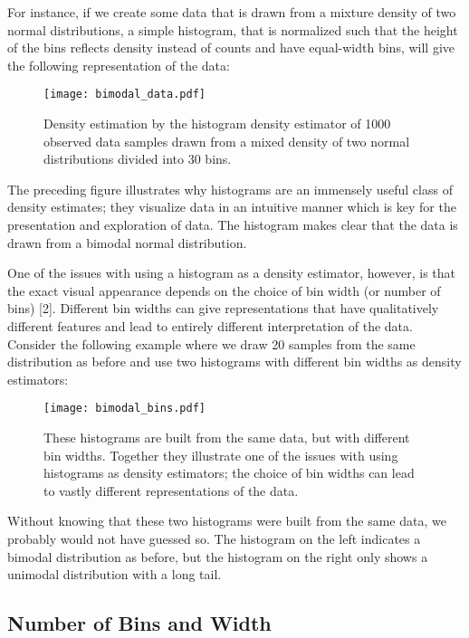 For instance, if we create some data that is drawn from a mixture density of two normal distributions, a simple  histogram, that is normalized such that the height of the bins reflects density instead of counts and have equal-width bins, will give the following representation of the data: 

\begin{figure}[H]
    \centering
    \texttt{[image: bimodal\_data.pdf]}
    \caption{Density estimation by the histogram density estimator of 1000 observed data samples drawn from a mixed density of two normal distributions divided into 30 bins.}
    \label{fig:bimodal_data}
\end{figure}

The preceding figure illustrates why histograms are an immensely useful class of density estimates; they visualize data in an intuitive manner which is key for the presentation and exploration of data. The histogram makes clear that the data is drawn from a bimodal normal distribution.

One of the issues with using a histogram as a density estimator, however, is that the exact visual appearance depends on the choice of bin width (or number of bins) [2]. Different bin widths can give representations that have qualitatively different features and lead to entirely different interpretation of the data. Consider the following example where we draw 20 samples from the same distribution as before and use two histograms with different bin widths as density estimators:

\begin{figure}[H]
    \centering
    \texttt{[image: bimodal\_bins.pdf]}
    \caption{These histograms are built from the same data, but with different bin widths. Together they illustrate one of the issues with using histograms as density estimators; the choice of bin widths can lead to vastly different representations of the data.}
    \label{fig:bimodal_bins}
\end{figure}

Without knowing that these two histograms were built from the same data, we probably would not have guessed so. The histogram on the left indicates a bimodal distribution as before, but the histogram on the right only shows a unimodal distribution with a long tail.   


\subsection{Number of Bins and Width}\label{sec:binning}



